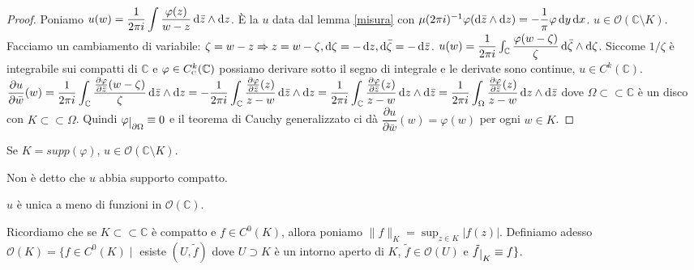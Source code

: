 \begin{proof}
  Poniamo $\displaystyle u(w)=\dfrac{1}{2\pi i}\int \dfrac{\varphi(z)}{w-z} \mathop{}\!\mathrm{d}\bar{z}\wedge\mathop{}\!\mathrm{d} z$. È la $u$ data dal lemma \ref{misura} con $\mu(2\pi i)^{-1}\varphi(\mathop{}\!\mathrm{d}\bar{z}\wedge\mathop{}\!\mathrm{d} z)=-\dfrac{1}{\pi}\varphi\mathop{}\!\mathrm{d} y\mathop{}\!\mathrm{d} x$.
  $u \in \mathcal{O}(\mathbb{C}\setminus K)$. Facciamo un cambiamento di variabile: $\zeta=w-z \Rightarrow z=w-\zeta, \mathop{}\!\mathrm{d}\zeta=-\mathop{}\!\mathrm{d} z, \mathop{}\!\mathrm{d}\bar{\zeta}=-\mathop{}\!\mathrm{d}\bar{z}$.
  $u(w)=\dfrac{1}{2\pi i} \int_{\mathbb{C}} \dfrac{\varphi(w-\zeta)}{\zeta}\mathop{}\!\mathrm{d}\bar{\zeta}\wedge\mathop{}\!\mathrm{d}\zeta$. Siccome $1/\zeta$ è integrabile sui compatti di $\mathbb{C}$ e $\varphi \in C^k_{\text{\textsc{c}}}(\mathbb{C})$ possiamo derivare sotto il segno di integrale e le derivate sono continue, $u \in C^k(\mathbb{C})$.
  $\displaystyle \dfrac{\partial u}{\partial \bar{w}}(w)=\dfrac{1}{2\pi i}\int_{\mathbb{C}} \dfrac{\frac{\partial \varphi}{\partial \bar{z}}(w-\zeta)}{\zeta} \diff \bar{z}\wedge\diff z=-\dfrac{1}{2\pi i}\int_{\mathbb{C}} \dfrac{\frac{\partial\varphi}{\partial\bar{z}}(z)}{z-w}\diff\bar{z}\wedge\diff z=\dfrac{1}{2\pi i}\int_{\mathbb{C}} \dfrac{\frac{\partial\varphi}{\partial\bar{z}}(z)}{z-w}\diff z\wedge\diff\bar{z}=\dfrac{1}{2\pi i}\int_{\Omega} \dfrac{\frac{\partial\varphi}{\partial\bar{z}}(z)}{z-w}\diff z\wedge\diff\bar{z}$ dove $\Omega \subset \subset \mathbb{C}$ è un disco con $K \subset\subset \Omega$.
  Quindi $\varphi\restrict{\partial \Omega}\equiv 0$ e il teorema di Cauchy generalizzato ci dà $\dfrac{\partial u}{\partial\bar{w}}(w)=\varphi(w)$ per ogni $w \in K$.
\end{proof}

\begin{oss}
  Se $K=supp(\varphi)$, $u \in \mathcal{O}(\mathbb{C} \setminus K)$.
\end{oss}

\begin{oss}
  Non è detto che $u$ abbia supporto compatto.
\end{oss}

\begin{oss}
  $u$ è unica a meno di funzioni in $\mathcal{O}(\mathbb{C})$.
\end{oss}

\begin{defn}
  Ricordiamo che se $K \subset\subset \mathbb{C}$ è compatto e $f \in C^0(K)$, allora poniamo $\|f\|_K=\sup_{z \in K}|f(z)|$.
  Definiamo adesso $\mathcal{O}(K)=\{f \in C^0(K) \mid$ esiste $(U, \tilde{f})$ dove $U \supset K$ è un intorno aperto di $K$, $\tilde{f} \in \mathcal{O}(U)$ e $\tilde{f}\restrict{K}\equiv f\}$.
\end{defn}

